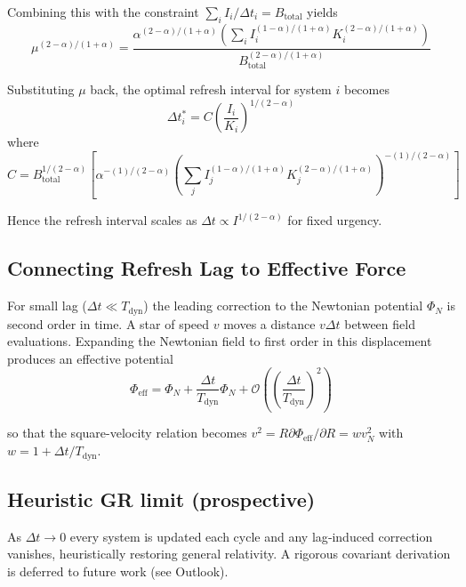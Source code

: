 \documentclass[twocolumn,prd,amsmath,amssymb,aps,superscriptaddress,nofootinbib]{revtex4-2}
\begin{document}
Combining this with the constraint $\sum_i I_i / \Delta t_i = B_{\text{total}}$ yields
\begin{equation}
\mu^{(2-\alpha)/(1+\alpha)} = \frac{\alpha^{(2-\alpha)/(1+\alpha)} \left( \sum_i I_i^{(1-\alpha)/(1+\alpha)} K_i^{(2-\alpha)/(1+\alpha)} \right)}{B_{\text{total}}^{(2-\alpha)/(1+\alpha)}}
\end{equation}

Substituting $\mu$ back, the optimal refresh interval for system $i$ becomes
\begin{equation}
\Delta t_i^* = C \left( \frac{I_i}{K_i} \right)^{1/(2-\alpha)}
\end{equation}
where 
\begin{equation}
C = B_{\text{total}}^{1/(2-\alpha)} \left[ \alpha^{-(1)/(2-\alpha)} \left(\sum_j I_j^{(1-\alpha)/(1+\alpha)} K_j^{(2-\alpha)/(1+\alpha)} \right)^{-(1)/(2-\alpha)} \right]
\end{equation}

Hence the refresh interval scales as $\Delta t \propto I^{1/(2-\alpha)}$ for fixed urgency.

\subsection{Connecting Refresh Lag to Effective Force}

For small lag ($\Delta t \ll T_{\text{dyn}}$) the leading correction to the Newtonian potential $\Phi_N$ is second order in time. A star of speed $v$ moves a distance $v\Delta t$ between field evaluations. Expanding the Newtonian field to first order in this displacement produces an effective potential
\begin{equation}
\Phi_{\text{eff}} = \Phi_N + \frac{\Delta t}{T_{\text{dyn}}} \Phi_N + \mathcal{O}\left(\left(\frac{\Delta t}{T_{\text{dyn}}}\right)^2\right)
\end{equation}

so that the square-velocity relation becomes $v^2 = R \partial\Phi_{\text{eff}}/\partial R = w v_N^2$ with $w = 1 + \Delta t/T_{\text{dyn}}$.

\subsection{Heuristic GR limit (prospective)}

As $\Delta t \to 0$ every system is updated each cycle and any lag‑induced correction vanishes, heuristically restoring general relativity. A rigorous covariant derivation is deferred to future work (see Outlook).
\end{document}
